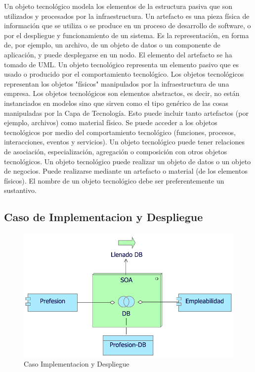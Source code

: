 Un objeto tecnológico modela los elementos de la estructura pasiva que son utilizados y procesados por la infraestructura. Un artefacto es una pieza física de información que se utiliza o se produce en un proceso de desarrollo de software, o por el despliegue y funcionamiento de un sistema. Es la representación, en forma de, por ejemplo, un archivo, de un objeto de datos o un componente de aplicación, y puede desplegarse en un nodo. El elemento del artefacto se ha tomado de UML. Un objeto tecnológico representa un elemento pasivo que es usado o producido por el comportamiento tecnológico. Los objetos tecnológicos representan los objetos "físicos" manipulados por la infraestructura de una empresa. Los objetos tecnológicos son elementos abstractos, es decir, no están instanciados en modelos sino que sirven como el tipo genérico de las cosas manipuladas por la Capa de Tecnología. Esto puede incluir tanto artefactos (por ejemplo, archivos) como material físico.
Se puede acceder a los objetos tecnológicos por medio del comportamiento tecnológico (funciones, procesos, interacciones, eventos y servicios). Un objeto tecnológico puede tener relaciones de asociación, especialización, agregación o composición con otros objetos tecnológicos. Un objeto tecnológico puede realizar un objeto de datos o un objeto de negocios. Puede realizarse mediante un artefacto o material (de los elementos físicos). El nombre de un objeto tecnológico debe ser preferentemente un sustantivo.

\newpage

\subsection{Caso  de Implementacion y Despliegue}
\begin{figure}[h!]
	\centering
	\includegraphics[width=.7\linewidth]{imgs/puntos_vista/tecnologia/despliegue.pdf}
	\caption{Caso Implementacion y Despliegue}
\end{figure}

